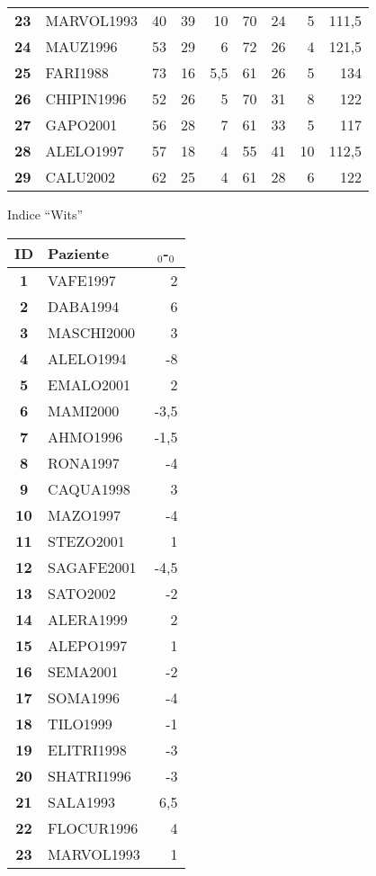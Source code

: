 \begin{landscape}
\begin{table}[p]
\begin{tabular}{>{\bfseries}cl*{3}{D{,}{,}{-1}}|*{3}{D{,}{,}{2.1}}|D{,}{,}{3.1}}
23 & MARVOL1993 & 40 & 39 & 10 & 70 & 24 & 5 & 111,5 \\
24 & MAUZ1996 & 53 & 29 & 6 & 72 & 26 & 4 & 121,5 \\
25 & FARI1988 & 73 & 16 & 5,5 & 61 & 26 & 5 & 134 \\
26 & CHIPIN1996 & 52 & 26 & 5 & 70 & 31 & 8 & 122 \\
27 & GAPO2001 & 56 & 28 & 7 & 61 & 33 & 5 & 117 \\
28 & ALELO1997 & 57 & 18 & 4 & 55 & 41 & 10 & 112,5 \\
29 & CALU2002 & 62 & 25 & 4 & 61 & 28 & 6 & 122 \\
\bottomrule
\end{tabular}
\end{table}

\begin{table}
\footnotesize
\centering
\begin{centeredcaption}{Indice ``Wits''}
\begin{tabular}{>{\bfseries}clD{,}{,}{-1}}
\toprule
ID & Paziente &  \\
 & VAFE1997 & 2 \\
2 & DABA1994 & 6 \\
3 & MASCHI2000 & 3 \\
4 & ALELO1994 & -8 \\
5 & EMALO2001 & 2 \\
6 & MAMI2000 & -3,5 \\
7 & AHMO1996 & -1,5 \\
8 & RONA1997 & -4 \\
9 & CAQUA1998 & 3 \\
10 & MAZO1997 & -4 \\
11 & STEZO2001 & 1 \\
12 & SAGAFE2001 & -4,5 \\
13 & SATO2002 & -2 \\
14 & ALERA1999 & 2 \\
15 & ALEPO1997 & 1 \\
16 & SEMA2001 & -2 \\
17 & SOMA1996 & -4 \\
18 & TILO1999 & -1 \\
19 & ELITRI1998 & -3 \\
20 & SHATRI1996 & -3 \\
21 & SALA1993 & 6,5 \\
22 & FLOCUR1996 & 4 \\
23 & MARVOL1993 & 1 \\

\end{tabular}
\end{centeredcaption}
\end{table}
\end{landscape}
